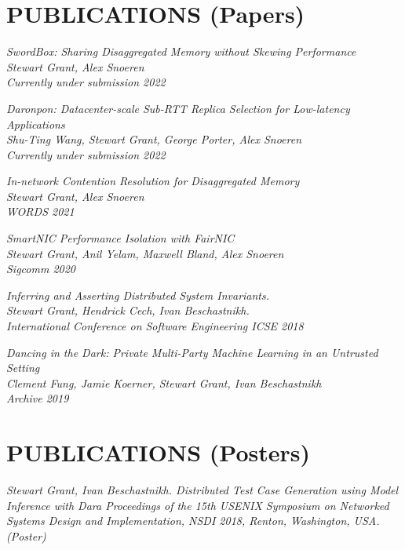 \documentclass[line,margin]{res}
\begin{document}
\address{https://www.stewartgrant.ca}
\address{ssgrant@eng.ucsd.edu}
\begin{resume}

    \section{PUBLICATIONS (Papers)}

{\sl 
    SwordBox: Sharing Disaggregated Memory without Skewing Performance \\
    Stewart Grant, Alex Snoeren\\
    Currently under submission 2022
    }

{\sl 
    Daronpon: Datacenter-scale Sub-RTT Replica Selection for Low-latency Applications \\
    Shu-Ting Wang, Stewart Grant, George Porter, Alex Snoeren\\
    Currently under submission 2022
    }

{\sl 
    In-network Contention Resolution for Disaggregated Memory \\
    Stewart Grant, Alex Snoeren\\
    WORDS 2021 \\
    }

{\sl 
    SmartNIC Performance Isolation with FairNIC \\
    Stewart Grant, Anil Yelam, Maxwell Bland, Alex Snoeren\\
    Sigcomm 2020 \\
    }

{\sl 
    Inferring and Asserting Distributed System Invariants. \\
    Stewart Grant, Hendrick Cech, Ivan Beschastnikh. \\
    International Conference on Software Engineering ICSE 2018 \\
    }

{\sl 
    Dancing in the Dark: Private Multi-Party Machine Learning in an Untrusted Setting \\
    Clement Fung, Jamie Koerner, Stewart Grant, Ivan Beschastnikh \\
    Archive 2019
    }

\section{PUBLICATIONS (Posters)}

{\sl Stewart Grant, Ivan Beschastnikh. 
    Distributed Test Case Generation using Model Inference with Dara
    \it{Proceedings of the 15th
    USENIX Symposium on Networked Systems Design and Implementation, NSDI 2018},
    Renton, Washington, USA. (Poster)}


\end{resume}
\end{document}
